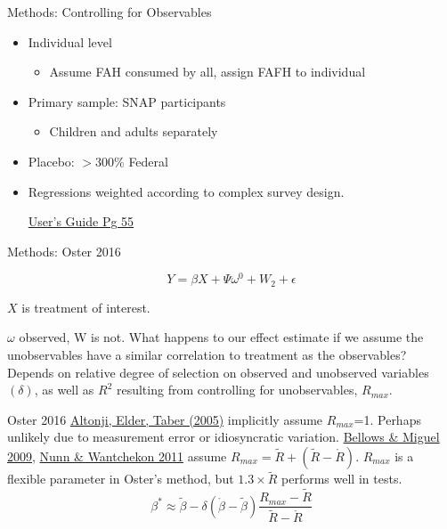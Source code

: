 \documentclass{beamer}
\begin{document}
\begin{frame}{Methods: Controlling for Observables}
\begin{itemize}
\item Individual level
\begin{itemize}
\item Assume FAH consumed by all, assign FAFH to individual
\end{itemize}
\item Primary sample: SNAP participants
\begin{itemize}
\item Children and adults separately
\end{itemize}
\item Placebo: $>300\%$ Federal 
\item Regressions weighted according to complex survey design. \begin{tiny}\href{https://www.ers.usda.gov/media/8804/0_foodaps-user-guide-puf.pdf}{User's Guide Pg 55}\end{tiny}
\end{itemize}
\end{frame}

\begin{frame}{Methods: Oster 2016}

$$Y=\beta X +\Psi \omega^0+W_2+\epsilon$$

$X$ is treatment of interest.

$\omega$ observed, W is not.
\vskip0.1in
What happens to our effect estimate if we assume the unobservables have a similar correlation to treatment as the observables?
\vskip0.1in
Depends on relative degree of selection on observed and unobserved variables $(\delta)$, as well as $R^2$ resulting from controlling for unobservables, $R_{max}$.
\end{frame}

\begin{frame}{Oster 2016}
\href{http://jhr.uwpress.org/content/XL/4/791.short}{Altonji, Elder, Taber (2005)} implicitly assume $R_{max}$=1. Perhaps unlikely due to measurement error or idiosyncratic variation.
\vskip0.1in
\href{http://www.sciencedirect.com/science/article/pii/S0047272709000942}{Bellows \& Miguel 2009}, \href{https://www.aeaweb.org/articles?id=10.1257/aer.101.7.3221}{Nunn \& Wantchekon 2011} assume $R_{max}=\tilde{R}+(\tilde{R}-\mathring{R})$. 
\vskip0.1in
$R_{max}$ is a flexible parameter in Oster's method, but $1.3\times\tilde{R}$ performs well in tests.
\vskip0.1in
$$\beta^* \approx \tilde{\beta}-\delta(\mathring{\beta}-\tilde{\beta})\frac{R_{max}-\tilde{R}}{\tilde{R}-\mathring{R}}$$ 

\end{frame}
\end{document}
